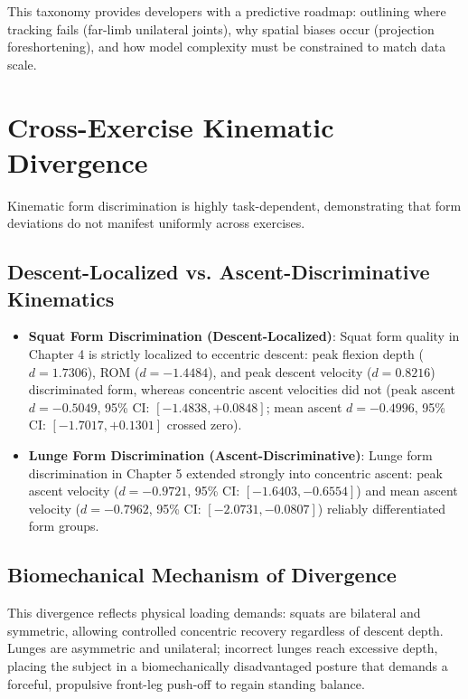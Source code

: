 This taxonomy provides developers with a predictive roadmap: outlining where tracking fails (far-limb unilateral joints), why spatial biases occur (projection foreshortening), and how model complexity must be constrained to match data scale.



\section{Cross-Exercise Kinematic Divergence}
\label{sec:14-3-cross-exercise-kinematic-divergence}


Kinematic form discrimination is highly task-dependent, demonstrating that form deviations do not manifest uniformly across exercises.

\subsection{Descent-Localized vs. Ascent-Discriminative Kinematics}
\label{sec:14-3-1-descent-localized-vs-ascent-discriminative-kinematics}

\begin{itemize}
  \item \textbf{Squat Form Discrimination (Descent-Localized)}: Squat form quality in Chapter 4 is strictly localized to eccentric descent: peak flexion depth ($d = 1.7306$), ROM ($d = -1.4484$), and peak descent velocity ($d = 0.8216$) discriminated form, whereas concentric ascent velocities did not (peak ascent $d = -0.5049$, 95\% CI: $[-1.4838, +0.0848]$; mean ascent $d = -0.4996$, 95\% CI: $[-1.7017, +0.1301]$ crossed zero).
  \item \textbf{Lunge Form Discrimination (Ascent-Discriminative)}: Lunge form discrimination in Chapter 5 extended strongly into concentric ascent: peak ascent velocity ($d = -0.9721$, 95\% CI: $[-1.6403, -0.6554]$) and mean ascent velocity ($d = -0.7962$, 95\% CI: $[-2.0731, -0.0807]$) reliably differentiated form groups.
\end{itemize}

\subsection{Biomechanical Mechanism of Divergence}
\label{sec:14-3-2-biomechanical-mechanism-of-divergence}

This divergence reflects physical loading demands: squats are bilateral and symmetric, allowing controlled concentric recovery regardless of descent depth. Lunges are asymmetric and unilateral; incorrect lunges reach excessive depth, placing the subject in a biomechanically disadvantaged posture that demands a forceful, propulsive front-leg push-off to regain standing balance.

